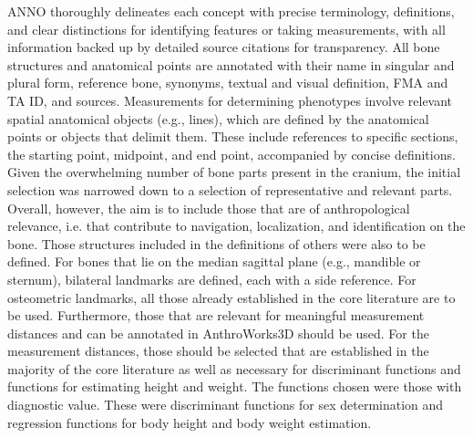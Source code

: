 \documentclass[sw]{iosart2x}
\newcommand{\aw}{AnthroWorks3D}
\begin{document}
ANNO thoroughly delineates each concept with precise terminology, definitions, and clear distinctions for identifying features or taking measurements, with all information backed up by detailed source citations for transparency.
All bone structures and anatomical points are annotated with their name in singular and plural form, reference bone, synonyms, textual and visual definition, FMA and TA ID, and sources.
%
Measurements for determining phenotypes involve relevant spatial anatomical objects (e.g., lines), which are defined by the anatomical points or objects that delimit them.
These include references to specific sections, the starting point, midpoint, and end point, accompanied by concise definitions.
Given the overwhelming number of bone parts present in the cranium, the initial selection was narrowed down to a selection of representative and relevant parts.
Overall, however, the aim is to include those that are of anthropological relevance, i.e. that contribute to navigation, localization, and identification on the bone.
Those structures included in the definitions of others were also to be defined.
For bones that lie on the median sagittal plane (e.g., mandible or sternum), bilateral landmarks are defined, each with a side reference.
For osteometric landmarks, all those already established in the core literature are to be used.
Furthermore, those that are relevant for meaningful measurement distances and can be annotated in \aw{} should be used.
For the measurement distances, those should be selected that are established in the majority of the core literature as well as necessary for discriminant functions and functions for estimating height and weight.
The functions chosen were those with diagnostic value.
These were discriminant functions for sex determination and regression functions for body height and body weight estimation.
\end{document}
